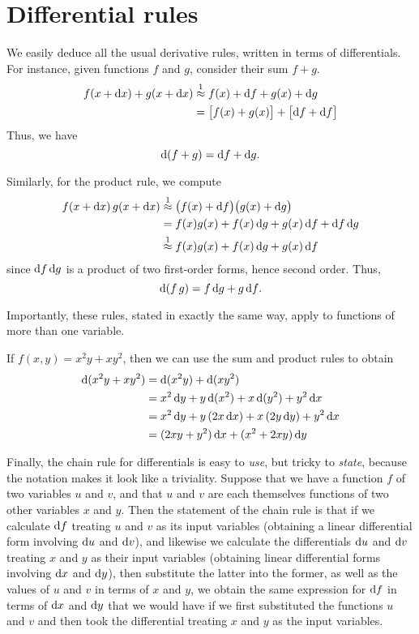 \documentclass[12pt]{amsart}
\begin{document}
\section{Differential rules}
\label{sec:differential-rules}

We easily deduce all the usual derivative rules, written in terms of differentials.
For instance, given functions $f$ and $g$, consider their sum $f+g$.
\begin{align*}
  f(x+{\mathrm{d} x}) + g(x+{\mathrm{d} x})
  &\mathrel{\overset{1}{\approx}} f(x) + {\mathrm{d} f} + g(x) + {\mathrm{d} g}\\
  &= \big[f(x) + g(x)\big] + \big[ {\mathrm{d} f} + {\mathrm{d} f} \big]
\end{align*}
Thus, we have
\[ \mathrm{d}(f+g) = {\mathrm{d} f} + {\mathrm{d} g}. \]

Similarly, for the product rule, we compute
\begin{align*}
  f(x+{\mathrm{d} x}) \, g(x+{\mathrm{d} x})
  &\mathrel{\overset{1}{\approx}} \big(f(x)+{\mathrm{d} f}\big)\big(g(x) + {\mathrm{d} g} \big)\\
  &= f(x) g(x) + f(x) \,{\mathrm{d} g} + g(x) \,{\mathrm{d} f} + {\mathrm{d} f}\,{\mathrm{d} g}\\
  &\mathrel{\overset{1}{\approx}} f(x) g(x) + f(x) \,{\mathrm{d} g} + g(x) \,{\mathrm{d} f}
\end{align*}
since ${\mathrm{d} f}\,{\mathrm{d} g}$ is a product of two first-order forms, hence second order.
Thus,
\[ \mathrm{d}(f\,g) = f\,{\mathrm{d} g} + g\,{\mathrm{d} f}.\]

Importantly, these rules, stated in exactly the same way, apply to functions of more than one variable.
\begin{eg}\label{eg:twovar-differential}
  If $f(x,y) = x^2y + xy^2$, then we can use the sum and product rules to obtain
  \begin{align*}
    \mathrm{d}(x^2y + xy^2) &= \mathrm{d}(x^2y) + \mathrm{d}(xy^2)\\
    &= x^2\,{\mathrm{d} y} + y \,\mathrm{d}(x^2) + x \,\mathrm{d}(y^2) + y^2\,{\mathrm{d} x}\\
    &= x^2\,{\mathrm{d} y} + y \,(2x\,{\mathrm{d} x}) + x\, (2y\,{\mathrm{d} y}) + y^2\,{\mathrm{d} x}\\
    &= (2xy + y^2)\,{\mathrm{d} x} + (x^2+2xy)\,{\mathrm{d} y}
  \end{align*}
\end{eg}

Finally, the chain rule for differentials is easy to \emph{use}, but tricky to \emph{state}, because the notation makes it look like a triviality.
Suppose that we have a function $f$ of two variables $u$ and $v$, and that $u$ and $v$ are each themselves functions of two other variables $x$ and $y$.
Then the statement of the chain rule is that if we calculate ${\mathrm{d} f}$ treating $u$ and $v$ as its input variables (obtaining a linear differential form involving ${\mathrm{d} u}$ and ${\mathrm{d} v}$), and likewise we calculate the differentials ${\mathrm{d} u}$ and ${\mathrm{d} v}$ treating $x$ and $y$ as their input variables (obtaining linear differential forms involving ${\mathrm{d} x}$ and ${\mathrm{d} y}$), then substitute the latter into the former, as well as the values of $u$ and $v$ in terms of $x$ and $y$, we obtain the same expression for ${\mathrm{d} f}$ in terms of ${\mathrm{d} x}$ and ${\mathrm{d} y}$ that we would have if we first substituted the functions $u$ and $v$ and then took the differential treating $x$ and $y$ as the input variables.
\end{document}
